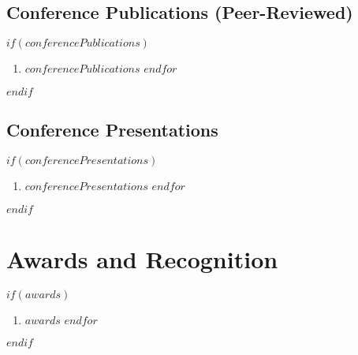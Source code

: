 \documentclass[$fontsize$, a4paper]{article}
\begin{document}
\subsection*{Conference Publications (Peer-Reviewed)}
$if(conferencePublications)$
\begin{enumerate}
$for(conferencePublications)$
\item $conferencePublications$
$endfor$
\end{enumerate}
$endif$

\subsection*{Conference Presentations}
$if(conferencePresentations)$
\begin{enumerate}
$for(conferencePresentations)$
\item $conferencePresentations$
$endfor$
\end{enumerate}
$endif$

\section*{Awards and Recognition}
$if(awards)$
\begin{enumerate}
$for(awards)$
\item $awards$
$endfor$
\end{enumerate}
$endif$
\end{document}
